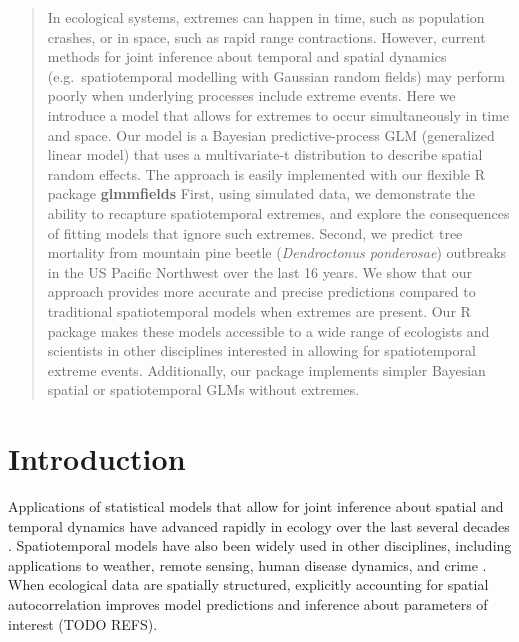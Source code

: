 \documentclass[12pt,english]{article}
\begin{document}
\begin{spacing}{1.9}
\linenumbers

\begin{abstract}

In ecological systems, extremes can happen
in time, such as population crashes,
or in space, such as rapid range contractions.
However, current methods for
joint inference about temporal and spatial dynamics
(e.g.\ spatiotemporal modelling with Gaussian random fields)
may perform poorly when
underlying processes include extreme events.
Here we introduce a model that allows for extremes
to occur simultaneously in time and space.
Our model is a Bayesian predictive-process GLM (generalized linear model)
that uses a multivariate-t distribution to describe spatial random effects.
The approach is easily implemented with
our flexible R package \textbf{glmmfields}
First, using simulated data,
we demonstrate the ability to recapture spatiotemporal extremes,
and explore the consequences of fitting models that ignore such extremes.
Second, we predict
tree mortality from mountain pine beetle (\emph{Dendroctonus ponderosae})
outbreaks in the US Pacific Northwest over the last 16 years.
We show that our approach provides
more accurate and precise predictions
compared to traditional spatiotemporal models
when extremes are present.
Our R package makes these models
accessible to a wide range of ecologists
and scientists in other disciplines interested in
allowing for spatiotemporal extreme events.
Additionally, our package
implements simpler Bayesian spatial or
spatiotemporal GLMs without extremes.
\end{abstract}

%
%

\section{Introduction}


Applications of statistical models that allow for joint inference about spatial
and temporal dynamics have advanced rapidly in ecology over the last several
decades \citep[e.g.][]{bascompte1995, latimer2009, conn2015}. Spatiotemporal
models have also been widely used in other disciplines, including applications
to weather, remote sensing, human disease dynamics, and crime
\citep{cressie2011}. When ecological data are spatially structured, explicitly
accounting for spatial autocorrelation improves model predictions and inference
about parameters of interest (TODO REFS).


\end{spacing}
\end{document}
